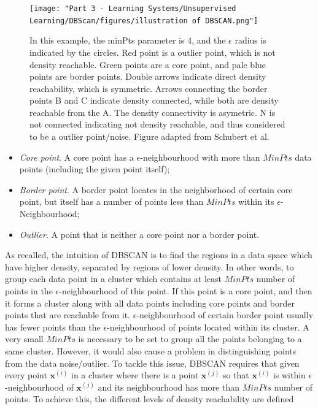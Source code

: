 \begin{figure}[tbp]
	\centering
	\texttt{[image: "Part 3 - Learning Systems/Unsupervised Learning/DBScan/figures/illustration of 
		DBSCAN.png"]}
	\caption{In this example, the minPts parameter is 4, and the $\epsilon$ 
		radius is indicated by the circles. Red point is a outlier point, which 
		is 
		not density reachable. Green points are a core point, and pale blue 
		points 
		are border points. Double arrows indicate direct density reachability, 
		which is symmetric. Arrows connecting the border points B and C 
		indicate 
		density connected, while both are density reachable from the A. The 
		density 
		connectivity is asymetric. N is not connected indicating not density 
		reachable, and thus considered to be a outlier point/noise. Figure adapted from 
		Schubert et al. 
		\cite{schubert2017dbscan}
	}
	\label{fig:relation}
\end{figure}



\begin{itemize}


\item\textit{Core point}. A core point has a $\epsilon$-neighbourhood with more than $MinPts$ data points (including the given point itself); 

\item\textit{Border point}. A border point locates in the neighborhood of certain core point, but itself has a number of points less than $MinPts$ within its $\epsilon$-Neighbourhood;


\item\textit{Outlier}. A point that is neither a core point nor a 
border point. 
	
\end{itemize}

As recalled, the intuition of DBSCAN is to find the regions in a data space 
which have higher density, separated by regions of lower density. In other 
words, to group each data point in a cluster which contains at least $MinPts$ 
number of points in the $\epsilon$-neighbourhood of this point. If this point is a core point, and then it forms a cluster along with all data points including core points and border points that are reachable from it. $\epsilon$-neighbourhood of certain border point usually has fewer points than the 
$\epsilon$-neighbourhood of points located within its cluster. A very small 
$MinPts$ is necessary to be set to group all the points belonging to a same 
cluster. However, it would also cause a problem in distinguishing points from 
the data noise/outlier. To tackle this issue, DBSCAN requires that given every 
point $\mathbf{x}^{(i)}$ in a cluster where there is a point $\mathbf{x}^{(j)}$ so 
that $\mathbf{x}^{(i)}$ is within $\epsilon$-neighbourhood of $\mathbf{x}^{(j)}$ 
and its neighbourhood has more than $MinPts$ number of points. To achieve this, 
the different levels of density reachability are defined \cite{ester1996density}


